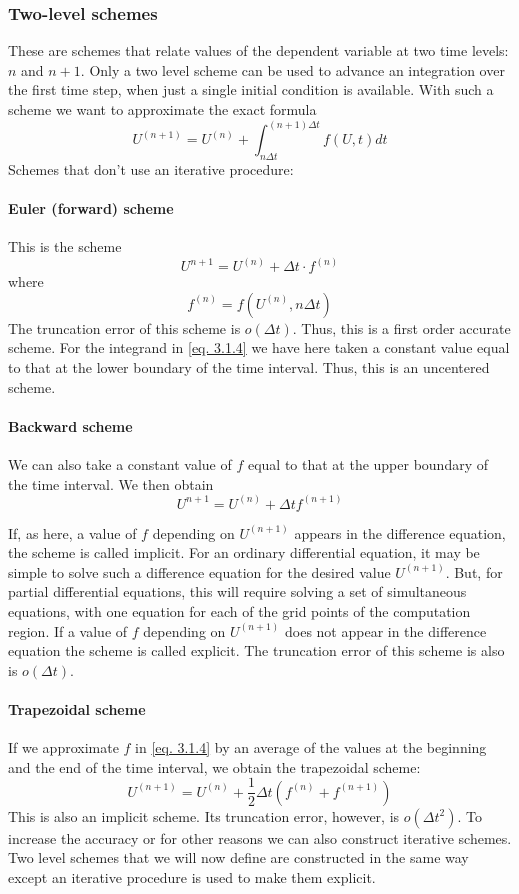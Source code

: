 \subsubsection{Two-level schemes}
These are schemes that relate values of the dependent variable at two time levels: $n$ and $n + 1$. Only a two level scheme can be used to advance an integration over the first time step, when just a single initial condition is available. With such a scheme we want to approximate the exact formula
\begin{equation}\label{eq. 3.1.4}
    U^{(n+1)}=U^{(n)}+\int_{n\Delta t}^{(n+1)\Delta t}f(U,t)dt
\end{equation}
Schemes that don't use an iterative procedure:
\paragraph{Euler (forward) scheme}
This is the scheme 
\begin{equation}\label{3.1.5}
    U^{n+1}=U^{(n)}+\Delta t\cdot f^{(n)}
\end{equation}
where
$$f^{(n)}=f\left(U^{(n)},n\Delta t\right)$$
The truncation error of this scheme is $o(\Delta t)$. Thus, this is a first order accurate scheme. For the integrand in \ref{eq. 3.1.4} we have here taken a constant value equal to that at the lower boundary of the time interval. Thus, this is an uncentered scheme.
\paragraph{Backward scheme}
We can also take a constant value of $f$ equal to that at the upper boundary of the time interval. We then obtain
\begin{equation}\label{3.1.6}
     U^{n+1}=U^{(n)}+\Delta t f^{(n+1)}
\end{equation}

If, as here, a value of $f$ depending on $U^{(n+1)}$ appears in the difference equation, the scheme is called implicit. For an ordinary differential equation, it may be simple to solve such a difference equation for the desired value $U^{(n+1)}$. But, for partial differential equations, this will require solving a set of simultaneous equations, with one equation for each of the grid points of the computation region. If a value of $f$ depending on $U^{(n+1)}$ does not appear in the difference equation the scheme is called explicit. The truncation error of this scheme is also is $o(\Delta t)$.
\paragraph{Trapezoidal scheme}
If we approximate $f$ in \ref{eq. 3.1.4} by an average of the values at the beginning and the end of the time interval, we obtain the trapezoidal scheme:
\begin{equation}\label{3.1.7}
    U^{(n+1)}=U^{(n)}+\frac{1}{2}\Delta t\left(f^{(n)}+f^{(n+1)}\right)
\end{equation}
This is also an implicit scheme. Its truncation error, however, is $o(\Delta t^2)$. To increase the accuracy or for other reasons we can also construct iterative schemes. Two level schemes that we will now define are constructed in the same way except an iterative procedure is used to make them explicit. 
